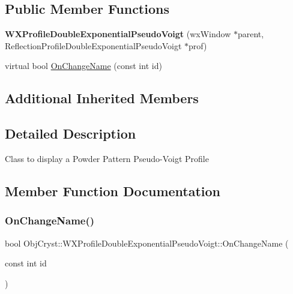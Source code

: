 \subsection*{Public Member Functions}
\begin{DoxyCompactItemize}
\item 
\mbox{\label{class_obj_cryst_1_1_w_x_profile_double_exponential_pseudo_voigt_ac12d36c7d203b3574c2954be0cc4257b}} 
{\bfseries W\+X\+Profile\+Double\+Exponential\+Pseudo\+Voigt} (wx\+Window $\ast$parent, Reflection\+Profile\+Double\+Exponential\+Pseudo\+Voigt $\ast$prof)
\item 
virtual bool \mbox{\hyperlink{class_obj_cryst_1_1_w_x_profile_double_exponential_pseudo_voigt_a292ef2513ec055a34d55b6b09b64213d}{On\+Change\+Name}} (const int id)
\end{DoxyCompactItemize}
\subsection*{Additional Inherited Members}


\subsection{Detailed Description}
Class to display a Powder Pattern Pseudo-\/\+Voigt Profile 

\subsection{Member Function Documentation}
\mbox{\label{class_obj_cryst_1_1_w_x_profile_double_exponential_pseudo_voigt_a292ef2513ec055a34d55b6b09b64213d}} 
\subsubsection{\texorpdfstring{OnChangeName()}{OnChangeName()}}
{\footnotesize\ttfamily bool Obj\+Cryst\+::\+W\+X\+Profile\+Double\+Exponential\+Pseudo\+Voigt\+::\+On\+Change\+Name (\begin{DoxyParamCaption}\item[{const int}]{id }\end{DoxyParamCaption})\hspace{0.3cm}{\ttfamily [virtual]}}

